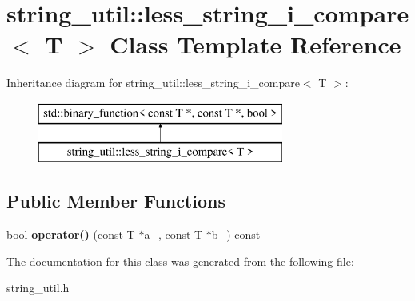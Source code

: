 \section{string\+\_\+util\+:\+:less\+\_\+string\+\_\+i\+\_\+compare$<$ T $>$ Class Template Reference}
\label{classstring__util_1_1less__string__i__compare}
Inheritance diagram for string\+\_\+util\+:\+:less\+\_\+string\+\_\+i\+\_\+compare$<$ T $>$\+:\begin{figure}[H]
\begin{center}
\leavevmode
\includegraphics[height=2.000000cm]{classstring__util_1_1less__string__i__compare}
\end{center}
\end{figure}
\subsection*{Public Member Functions}
\begin{DoxyCompactItemize}
\item 
bool {\bfseries operator()} (const T $\ast$a\+\_\+, const T $\ast$b\+\_\+) const \label{classstring__util_1_1less__string__i__compare_ae2dd6a625b07bc51060805b30e7547a1}

\end{DoxyCompactItemize}


The documentation for this class was generated from the following file\+:\begin{DoxyCompactItemize}
\item 
string\+\_\+util.\+h\end{DoxyCompactItemize}
